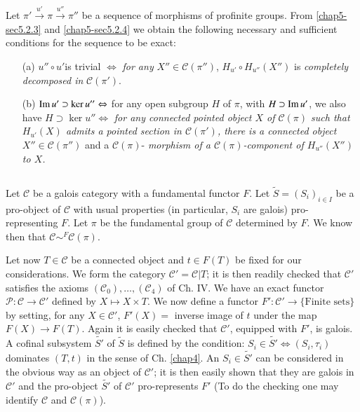 \subsection{}\label{chap5-sec5.2.5}
Let $\pi'\xrightarrow{u'}\pi\xrightarrow{u''}\pi''$ be a sequence of
morphisms of profinite groups. From \ref{chap5-sec5.2.3} and
\ref{chap5-sec5.2.4} 
we obtain the following necessary and sufficient conditions for the
sequence to be exact:
\begin{itemize}
\item[(a)] $u''\circ u'$\pageoriginale is trivial $\Leftrightarrow$
  {\em for any} $X''\in \mathscr{C}(\pi'')$, $H_{u'}\circ
  H_{u''}(X'')$ is {\em completely decomposed in} $\mathscr{C}(\pi')$.

\item[(b)] $\operatorname{Im} u'\supset \ker u''\Leftrightarrow$ for any open
  subgroup $H$ of $\pi$, with $H\supset \operatorname{Im} u'$, we also have
  $H\supset \ker u''\Leftrightarrow$ {\em for any connected pointed
    object $X$ of $\mathscr{C}(\pi)$ such that $H_{u'}(X)$ admits a
    pointed section in $\mathscr{C}(\pi')$, there is a connected
    object $X''\in\mathscr{C}(\pi'')$} and a $\mathscr{C}(\pi)$-{\em
    morphism of a $\mathscr{C}(\pi)$-component of $H_{u''}(X'')$ to $X$.}
\end{itemize}

\subsection{}\label{chap5-sec5.2.6}
Let $\mathscr{C}$ be a galois category with a fundamental functor
$F$. Let $\widetilde{S}=(S_{i})_{i\in I}$ be a pro-object of
$\mathscr{C}$ with usual properties (in particular, $S_{i}$ are
galois) pro-representing $F$. Let $\pi$ be the fundamental group of
$\mathscr{C}$ determined by $F$. We know then that
$\mathscr{C}{\displaystyle{\mathop{\sim}^{F}}}\mathscr{C}(\pi)$. 

Let now $T\in\mathscr{C}$ be a connected object and $t\in F(T)$ be
fixed for our considerations. We form the category
$\mathscr{C}'=\mathscr{C}|T$; it is then readily checked that
$\mathscr{C}'$ satisfies the axioms
$(\mathscr{C}_{0}),\ldots,(\mathscr{C}_{4})$ of Ch. IV. We have an
exact functor $\mathscr{P}:\mathscr{C}\to \mathscr{C}'$ defined by
$X\mapsto X\times T$. We now define a functor
$F':\mathscr{C}'\to\{\text{Finite sets}\}$ by setting, for any
$X\in\mathscr{C}'$, $F'(X)=$ inverse image of $t$ under the map
$F(X)\to F(T)$. Again it is easily checked that $\mathscr{C}'$,
equipped with $F'$, is galois. A cofinal subsystem $\widetilde{S'}$ of
$\widetilde{S}$ is defined by the condition:
$S_{i}\in\widetilde{S'}\Leftrightarrow (S_{i},\tau_{i})$ dominates
$(T,t)$ in the sense of Ch. \ref{chap4}. An\pageoriginale
$S_{i}\in\widetilde{S'}$ can be considered in the obvious way as an
object of $\mathscr{C}'$; it is then easily shown that they are galois
in $\mathscr{C}'$ and the pro-object $\widetilde{S'}$ of
$\mathscr{C}'$ pro-represents $F'$ (To do the checking one may
identify $\mathscr{C}$ and $\mathscr{C}(\pi)$). 

